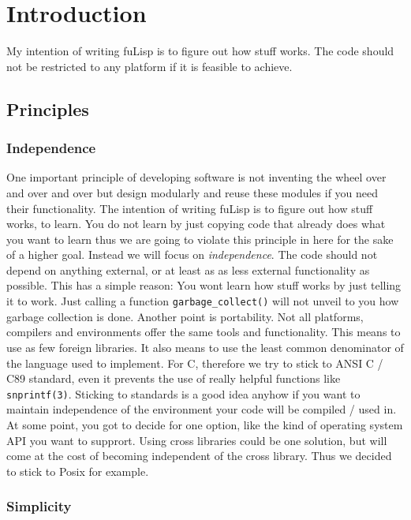 \section{Introduction}

My intention of writing fuLisp is to figure out how stuff works.
The code should not be restricted to any platform if it is feasible to achieve.

\subsection{Principles}

\subsubsection{Independence}

One important principle of developing software is not inventing the wheel over
and over and over but design modularly and reuse these modules if you need 
their functionality.
The intention of writing fuLisp is to figure out how stuff works, to learn.
You do not learn by just copying code that already does what you want to learn
thus we are going to violate this principle in here for the sake of a higher 
goal.
Instead we will focus on \emph{independence}.
The code should not depend on anything external, or at least as as less
external functionality as possible.
This has a simple reason: You wont learn how stuff works by just telling it to 
work. Just calling a function \texttt{garbage\_collect()} will not unveil to you
how garbage collection is done.
Another point is portability.
Not all platforms, compilers and environments offer the same tools and 
functionality. 
This means to use as few foreign libraries. It also means to use the least 
common denominator of the language used to implement. For C, therefore we try 
to stick to ANSI C / C89 standard, even it prevents the use of really helpful 
functions like \texttt{snprintf(3)}.
Sticking to standards is a good idea anyhow if you want to maintain independence
of the environment your code will be compiled / used in.
At some point, you got to decide for one option, like the kind of operating 
system API you want to supprort. 
Using cross libraries could be one solution, but will come at the cost of 
becoming independent of the cross library.
Thus we decided to stick to Posix for example.

\subsubsection{\label{sec:simplicity}Simplicity}

